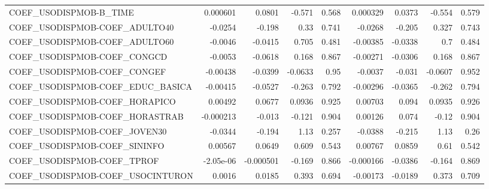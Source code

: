 \begin{tabular}{lrrrrrrrr}
COEF\_USODISPMOB-B\_TIME            &    0.000601 &       0.0801 &  -0.571 &    0.568 &   0.000329 &      0.0373 &       -0.554 &         0.579 \\
COEF\_USODISPMOB-COEF\_ADULTO40     &     -0.0254 &       -0.198 &    0.33 &    0.741 &    -0.0268 &      -0.205 &        0.327 &         0.743 \\
COEF\_USODISPMOB-COEF\_ADULTO60     &     -0.0046 &      -0.0415 &   0.705 &    0.481 &   -0.00385 &     -0.0338 &          0.7 &         0.484 \\
COEF\_USODISPMOB-COEF\_CONGCD       &     -0.0053 &      -0.0618 &   0.168 &    0.867 &   -0.00271 &     -0.0306 &        0.168 &         0.867 \\
COEF\_USODISPMOB-COEF\_CONGEF       &    -0.00438 &      -0.0399 & -0.0633 &     0.95 &    -0.0037 &      -0.031 &      -0.0607 &         0.952 \\
COEF\_USODISPMOB-COEF\_EDUC\_BASICA  &    -0.00415 &      -0.0527 &  -0.263 &    0.792 &   -0.00296 &     -0.0365 &       -0.262 &         0.794 \\
COEF\_USODISPMOB-COEF\_HORAPICO     &     0.00492 &       0.0677 &  0.0936 &    0.925 &    0.00703 &       0.094 &       0.0935 &         0.926 \\
COEF\_USODISPMOB-COEF\_HORASTRAB    &   -0.000213 &       -0.013 &  -0.121 &    0.904 &    0.00126 &       0.074 &        -0.12 &         0.904 \\
COEF\_USODISPMOB-COEF\_JOVEN30      &     -0.0344 &       -0.194 &    1.13 &    0.257 &    -0.0388 &      -0.215 &         1.13 &          0.26 \\
COEF\_USODISPMOB-COEF\_SININFO      &     0.00567 &       0.0649 &   0.609 &    0.543 &    0.00767 &      0.0859 &         0.61 &         0.542 \\
COEF\_USODISPMOB-COEF\_TPROF        &   -2.05e-06 &    -0.000501 &  -0.169 &    0.866 &  -0.000166 &     -0.0386 &       -0.164 &         0.869 \\
COEF\_USODISPMOB-COEF\_USOCINTURON  &      0.0016 &       0.0185 &   0.393 &    0.694 &   -0.00173 &     -0.0189 &        0.373 &         0.709 \\
\bottomrule
\end{tabular}
